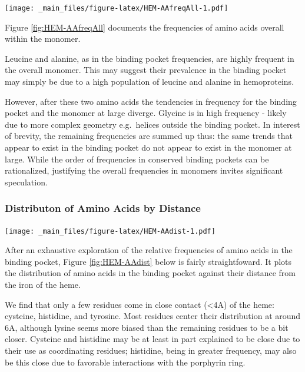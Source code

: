 \documentclass[a4paper, nobind]{templates/ociamthesis}
\let\origfigure\figure
\let\endorigfigure\endfigure
\renewenvironment{figure}[1][2] {
    \expandafter\origfigure\expandafter[H]
} {
    \endorigfigure
}
\begin{document}
\begin{figure}
\centering
\texttt{[image: \_main\_files/figure-latex/HEM-AAfreqAll-1.pdf]}
\caption{\label{fig:HEM-AAfreqAll}HEM: AA Frequency of Monomer}
\end{figure}

Figure \ref{fig:HEM-AAfreqAll} documents the frequencies of amino acids overall within the monomer.

Leucine and alanine, as in the binding pocket frequencies, are highly frequent in the overall monomer. This may suggest their prevalence in the binding pocket may simply be due to a high population of leucine and alanine in hemoproteins.

However, after these two amino acids the tendencies in frequency for the binding pocket and the monomer at large diverge. Glycine is in high frequency - likely due to more complex geometry e.g.~helices outside the binding pocket. In interest of brevity, the remaining frequencies are summed up thus: the same trends that appear to exist in the binding pocket do not appear to exist in the monomer at large. While the order of frequencies in conserved binding pockets can be rationalized, justifying the overall frequencies in monomers invites significant speculation.

\hypertarget{distributon-of-amino-acids-by-distance}{%
\subsubsection{Distributon of Amino Acids by Distance}\label{distributon-of-amino-acids-by-distance}}

\begin{figure}
\centering
\texttt{[image: \_main\_files/figure-latex/HEM-AAdist-1.pdf]}
\caption{\label{fig:HEM-AAdist}HEM: Residue Distribution by Distance}
\end{figure}

After an exhaustive exploration of the relative frequencies of amino acids in the binding pocket, Figure \ref{fig:HEM-AAdist} below is fairly straightfoward. It plots the distribution of amino acids in the binding pocket against their distance from the iron of the heme.

We find that only a few residues come in close contact (\textless4A) of the heme: cysteine, histidine, and tyrosine. Most residues center their distribution at around 6A, although lysine seems more biased than the remaining residues to be a bit closer. Cysteine and histidine may be at least in part explained to be close due to their use as coordinating residues; histidine, being in greater frequency, may also be this close due to favorable interactions with the porphyrin ring.
\end{document}
